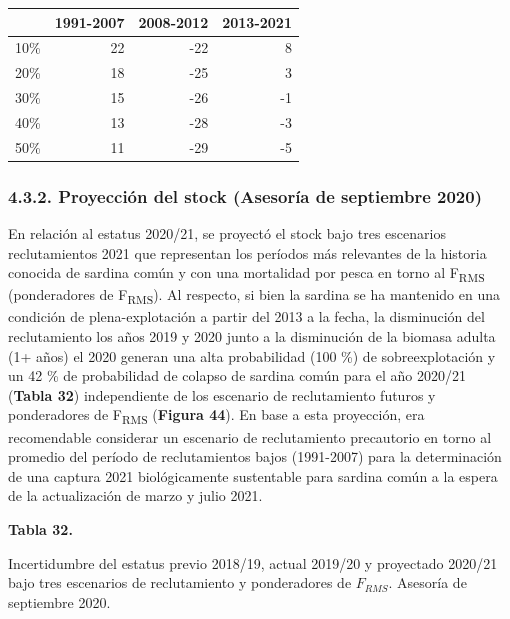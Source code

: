 \documentclass[
  spanish,
]{article}
\begin{document}
\begin{longtable}[]{@{}lrrr@{}}
\toprule
& 1991-2007 & 2008-2012 & 2013-2021\tabularnewline
\midrule
\endhead
10\% & 22 & -22 & 8\tabularnewline
20\% & 18 & -25 & 3\tabularnewline
30\% & 15 & -26 & -1\tabularnewline
40\% & 13 & -28 & -3\tabularnewline
50\% & 11 & -29 & -5\tabularnewline
\bottomrule
\end{longtable}

\normalsize

\pagebreak

\hypertarget{proyecciuxf3n-del-stock-asesoruxeda-de-septiembre-2020}{%
\subsubsection{4.3.2. Proyección del stock (Asesoría de septiembre
2020)}\label{proyecciuxf3n-del-stock-asesoruxeda-de-septiembre-2020}}

En relación al estatus 2020/21, se proyectó el stock bajo tres
escenarios reclutamientos 2021 que representan los períodos más
relevantes de la historia conocida de sardina común y con una mortalidad
por pesca en torno al F\textsubscript{RMS} (ponderadores de
F\textsubscript{RMS}). Al respecto, si bien la sardina se ha mantenido
en una condición de plena-explotación a partir del 2013 a la fecha, la
disminución del reclutamiento los años 2019 y 2020 junto a la
disminución de la biomasa adulta (1+ años) el 2020 generan una alta
probabilidad (100 \%) de sobreexplotación y un 42 \% de probabilidad de
colapso de sardina común para el año 2020/21 (\textbf{Tabla 32})
independiente de los escenario de reclutamiento futuros y ponderadores
de F\textsubscript{RMS} (\textbf{Figura 44}). En base a esta proyección,
era recomendable considerar un escenario de reclutamiento precautorio en
torno al promedio del período de reclutamientos bajos (1991-2007) para
la determinación de una captura 2021 biológicamente sustentable para
sardina común a la espera de la actualización de marzo y julio 2021.

\vspace{0.5cm}

\small
\begin{center} 
\textbf{Tabla 32.}
\end{center}
\begin{center} 
\vspace{-0.2cm} Incertidumbre del estatus previo 2018/19, actual 2019/20 y proyectado 2020/21 bajo tres escenarios de reclutamiento y ponderadores de $F_{RMS}$. Asesoría de septiembre 2020.
\end{center}
\vspace{-0.2cm}
\end{document}
